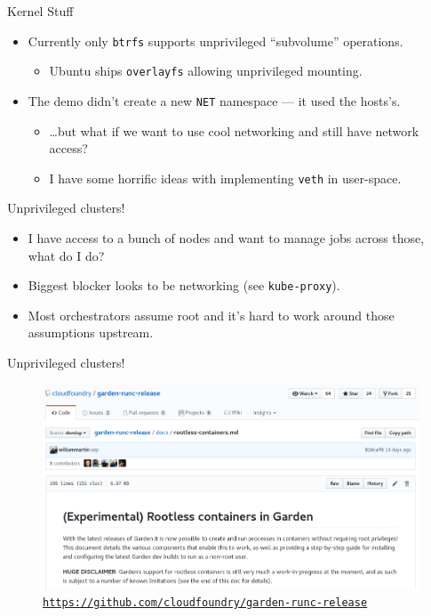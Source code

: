 \documentclass[10pt,aspectratio=169]{beamer}
\begin{document}
	\begin{frame}{Kernel Stuff}
		\begin{itemize}
		    \item Currently only \texttt{btrfs} supports unprivileged ``subvolume'' operations.
		    \begin{itemize}
    		    \item Ubuntu ships \texttt{overlayfs} allowing unprivileged mounting.
		    \end{itemize}
		    \item The demo didn't create a new \texttt{NET} namespace --- it used the hosts's.
		    \begin{itemize}
		        \item \dots but what if we want to use cool networking and still have network access?
		        \item I have some horrific ideas with implementing \texttt{veth} in user-space.
		    \end{itemize}
		\end{itemize}
	\end{frame}

	\begin{frame}{Unprivileged clusters!}
		\begin{itemize}
			\item I have access to a bunch of nodes and want to manage jobs across those, what do I do?
			\item Biggest blocker looks to be networking (see \texttt{kube-proxy}).
			\item Most orchestrators assume root and it's hard to work around those assumptions upstream.
		\end{itemize}
	\end{frame}

	\begin{frame}[noframenumbering]{Unprivileged clusters!}
	    \begin{figure}
		    \centering
    		    \includegraphics[width=\linewidth,height=0.6\textheight,keepaspectratio]{cf_screenshot}
	        \caption{\tt\underline{\url{https://github.com/cloudfoundry/garden-runc-release}}}
	    \end{figure}
	\end{frame}
	
\end{document}
